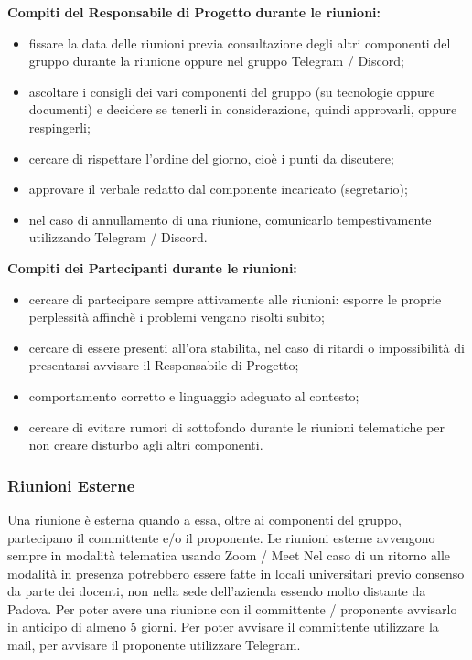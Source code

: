 \textbf{Compiti del Responsabile di Progetto durante le riunioni:}
\begin{itemize}
\item{fissare la data delle riunioni previa consultazione degli altri componenti del gruppo durante la riunione oppure nel gruppo Telegram / Discord;}
\item{ascoltare i consigli dei vari componenti del gruppo (su tecnologie oppure documenti) e decidere se tenerli in considerazione, quindi approvarli, oppure respingerli;}
\item{cercare di rispettare l'ordine del giorno, cioè i punti da discutere;}
\item{approvare il verbale redatto dal componente incaricato (segretario);}
\item{nel caso di annullamento di una riunione, comunicarlo tempestivamente utilizzando Telegram / Discord.}
\end{itemize}
\textbf{Compiti dei Partecipanti durante le riunioni:}
\begin{itemize}
\item{cercare di partecipare sempre attivamente alle riunioni: esporre le proprie perplessità affinchè i problemi vengano risolti subito;}
\item{cercare di essere presenti all'ora stabilita, nel caso di ritardi o impossibilità di presentarsi avvisare il Responsabile di Progetto;}
\item{comportamento corretto e linguaggio adeguato al contesto;}
\item{cercare di evitare rumori di sottofondo durante le riunioni telematiche per non creare disturbo agli altri componenti.}
\end{itemize}

\subsubsection{Riunioni Esterne}
Una riunione è esterna quando a essa, oltre ai componenti del gruppo, partecipano il committente e/o il proponente.
Le riunioni esterne avvengono sempre in modalità telematica usando Zoom / Meet 
Nel caso di un ritorno alle modalità in presenza potrebbero essere fatte in locali universitari previo consenso da parte dei docenti, non nella sede dell'azienda essendo molto distante da Padova.
Per poter avere una riunione con il committente / proponente avvisarlo in anticipo di almeno 5 giorni.
Per poter avvisare il committente utilizzare la mail, per avvisare il proponente utilizzare Telegram.

